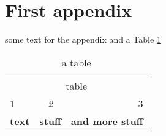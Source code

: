 \section{First appendix}\label{appen1}
some text for the appendix and a Table \ref{tab1}

\begin{table}
    \begin{tabular}{lll}
        \multicolumn{3}{c}{table}                                                \\
        1             & \multicolumn{1}{c}{\textit{2}} & \multicolumn{1}{r}{3}   \\
        \textbf{text} & \textbf{stuff}                 & \textbf{and more stuff}
    \end{tabular}
    \caption{a table}
    \label{tab1}
\end{table}

